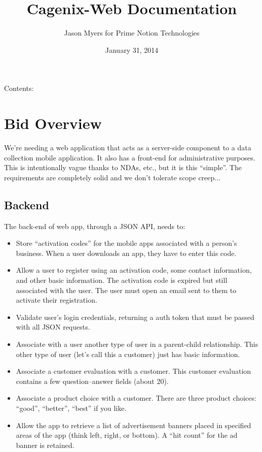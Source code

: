 \documentclass[letterpaper,10pt,english]{sphinxmanual}
\title{Cagenix-Web Documentation}
\date{January 31, 2014}
\author{Jason Myers for Prime Notion Technologies}
\begin{document}
\maketitle
\tableofcontents
{}\label{index::doc}


Contents:


\chapter{Bid Overview}
\label{dev-bid:welcome-to-cagenix-web-s-documentation}\label{dev-bid::doc}\label{dev-bid:bid-overview}
We’re needing a web application that acts as a server-side component to a data collection mobile application. It also has a front-end for administrative purposes. This is intentionally vague thanks to NDAs, etc., but it is this “simple”. The requirements are completely solid and we don’t tolerate scope creep...


\section{Backend}
\label{dev-bid:backend}
The back-end of web app, through a JSON API, needs to:
\begin{itemize}
\item {} 
Store “activation codes” for the mobile apps associated with a person’s business. When a user downloads an app, they have to enter this code.

\item {} 
Allow a user to register using an activation code, some contact information, and other basic information. The activation code is expired but still associated with the user. The user must open an email sent to them to activate their registration.

\item {} 
Validate user’s login credentials, returning a auth token that must be passed with all JSON requests.

\item {} 
Associate with a user another type of user in a parent-child relationship. This other type of user (let’s call this a customer) just has basic information.

\item {} 
Associate a customer evaluation with a customer. This customer evaluation contains a few question–answer fields (about 20).

\item {} 
Associate a product choice with a customer. There are three product choices: “good”, “better”, “best” if you like.

\item {} 
Allow the app to retrieve a list of advertisement banners placed in specified areas of the app (think left, right, or bottom). A “hit count” for the ad banner is retained.

\end{itemize}
\end{document}
